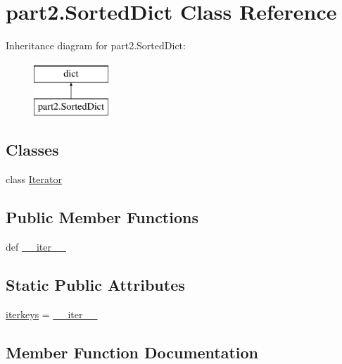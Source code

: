 \hypertarget{classpart2_1_1SortedDict}{}\section{part2.\+Sorted\+Dict Class Reference}
\label{classpart2_1_1SortedDict}
Inheritance diagram for part2.\+Sorted\+Dict\+:\begin{figure}[H]
\begin{center}
\leavevmode
\includegraphics[height=2.000000cm]{classpart2_1_1SortedDict}
\end{center}
\end{figure}
\subsection*{Classes}
\begin{DoxyCompactItemize}
\item 
class \hyperlink{classpart2_1_1SortedDict_1_1Iterator}{Iterator}
\end{DoxyCompactItemize}
\subsection*{Public Member Functions}
\begin{DoxyCompactItemize}
\item 
def \hyperlink{classpart2_1_1SortedDict_a14bc3af93d127a6a532aaf7877f4656f}{\+\_\+\+\_\+iter\+\_\+\+\_\+}
\end{DoxyCompactItemize}
\subsection*{Static Public Attributes}
\begin{DoxyCompactItemize}
\item 
\hyperlink{classpart2_1_1SortedDict_ae7bae3613fc33fba152131b8f1bd6427}{iterkeys} = \hyperlink{classpart2_1_1SortedDict_a14bc3af93d127a6a532aaf7877f4656f}{\+\_\+\+\_\+iter\+\_\+\+\_\+}
\end{DoxyCompactItemize}


\subsection{Member Function Documentation}
\hypertarget{classpart2_1_1SortedDict_a14bc3af93d127a6a532aaf7877f4656f}{}
